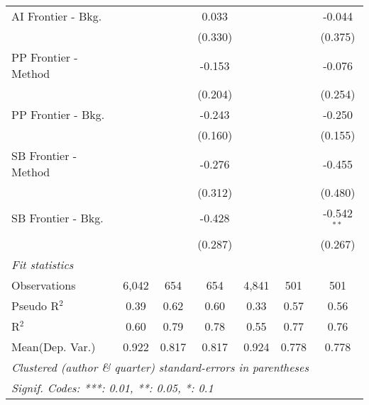 \begin{tabular}{lcccccc}
   AI Frontier - Bkg.   &              &               & 0.033       &              &               & -0.044\\   
                        &              &               & (0.330)     &              &               & (0.375)\\   
   PP Frontier - Method &              &               & -0.153      &              &               & -0.076\\   
                        &              &               & (0.204)     &              &               & (0.254)\\   
   PP Frontier - Bkg.   &              &               & -0.243      &              &               & -0.250\\   
                        &              &               & (0.160)     &              &               & (0.155)\\   
   SB Frontier - Method &              &               & -0.276      &              &               & -0.455\\   
                        &              &               & (0.312)     &              &               & (0.480)\\   
   SB Frontier - Bkg.   &              &               & -0.428      &              &               & -0.542$^{**}$\\   
                        &              &               & (0.287)     &              &               & (0.267)\\   
   \midrule
   \emph{Fit statistics}\\
   Observations         & 6,042        & 654           & 654         & 4,841        & 501           & 501\\  
   Pseudo R$^2$         & 0.39         & 0.62          & 0.60        & 0.33         & 0.57          & 0.56\\  
   R$^2$                & 0.60         & 0.79          & 0.78        & 0.55         & 0.77          & 0.76\\  
Mean(Dep. Var.) & 0.922 & 0.817 & 0.817 & 0.924 & 0.778 & 0.778 \\
   \midrule \midrule
   \multicolumn{7}{l}{\emph{Clustered (author \& quarter) standard-errors in parentheses}}\\
   \multicolumn{7}{l}{\emph{Signif. Codes: ***: 0.01, **: 0.05, *: 0.1}}\\
\end{tabular}
\par\endgroup
